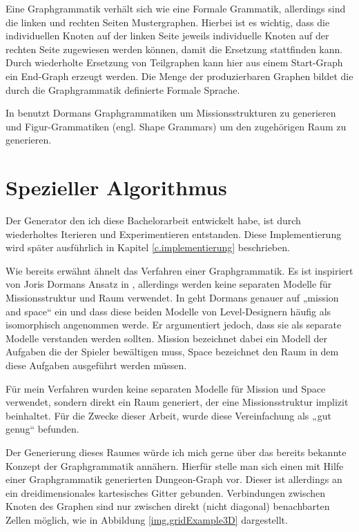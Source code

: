 Eine Graphgrammatik verhält sich wie eine Formale Grammatik, allerdings sind die linken und rechten Seiten Mustergraphen. Hierbei ist es wichtig, dass die individuellen Knoten auf der linken Seite jeweils individuelle Knoten auf der rechten Seite zugewiesen werden können, damit die Ersetzung stattfinden kann. 
\cite[Kap.~5.5.1, S.~80]{shaker2016procedural}
Durch wiederholte Ersetzung von Teilgraphen kann hier aus einem Start-Graph ein End-Graph erzeugt werden. Die Menge der produzierbaren Graphen bildet die durch die Graphgrammatik definierte Formale Sprache. 

In \cite{dormansAdventures} benutzt Dormans Graphgrammatiken um Missionsstrukturen zu generieren und Figur-Grammatiken (engl. Shape Grammars) um den zugehörigen Raum zu generieren.

\section{Spezieller Algorithmus}\label{s.speziellerAlgorithmus}

Der Generator den ich diese Bachelorarbeit entwickelt habe, ist durch wiederholtes Iterieren und Experimentieren entstanden. Diese Implementierung wird später ausführlich in Kapitel \ref{c.implementierung} beschrieben.

Wie bereits erwähnt ähnelt das Verfahren einer Graphgrammatik. Es ist inspiriert von Joris Dormans Ansatz in 
\cite{dormansAdventures},
allerdings werden keine separaten Modelle für Missionsstruktur und Raum verwendet.
In \cite{dormansModelTransformation} geht Dormans genauer auf „mission and space“ ein und dass diese beiden Modelle von Level-Designern häufig als isomorphisch angenommen werde. Er argumentiert jedoch, dass sie als separate Modelle verstanden werden sollten. Mission bezeichnet dabei ein Modell der Aufgaben die der Spieler bewältigen muss, Space bezeichnet den Raum in dem diese Aufgaben ausgeführt werden müssen.

Für mein Verfahren wurden keine separaten Modelle für Mission und Space verwendet, sondern direkt ein Raum generiert, der eine Missionsstruktur implizit beinhaltet. Für die Zwecke dieser Arbeit, wurde diese Vereinfachung als „gut genug“ befunden.

Der Generierung dieses Raumes würde ich mich gerne über das bereits bekannte Konzept der Graphgrammatik annähern. Hierfür stelle man sich einen mit Hilfe einer Graphgrammatik generierten Dungeon-Graph vor. Dieser ist allerdings an ein dreidimensionales kartesisches Gitter gebunden. Verbindungen zwischen Knoten des Graphen sind nur zwischen direkt (nicht diagonal) benachbarten Zellen möglich, wie in Abbildung \ref{img.gridExample3D} dargestellt.


